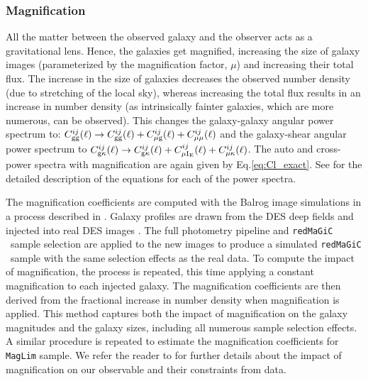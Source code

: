\documentclass[aps, prd,twocolumn,superscriptaddress,nofootinbib,preprintnumbers]{revtex4-1}
\newcommand{\redmagic}{\texttt{redMaGiC} }
\newcommand{\maglim}{\texttt{MagLim} }
\begin{document}
\subsubsection{Magnification}
All the matter between the observed galaxy and the observer acts as a gravitational lens. Hence, the galaxies get magnified, increasing the size of galaxy images (parameterized by the magnification factor, $\mu$) and increasing their total flux. The increase in the size of galaxies decreases the observed number density (due to stretching of the local sky), whereas increasing the total flux results in an increase in number density (as intrinsically fainter galaxies, which are more numerous, can be observed). This changes the galaxy-galaxy angular power spectrum to: $C^{ij}_{\rm gg}(\ell) \to C^{ij}_{\rm gg}(\ell) + C^{ij}_{\rm \mu g}(\ell) + C^{ij}_{\rm \mu \mu}(\ell) $ and the galaxy-shear angular power spectrum to $C^{ij}_{\rm g\kappa}(\ell) \to C^{ij}_{\rm g\kappa}(\ell) + C^{ij}_{\rm \mu I_{\rm E}}(\ell) + C^{ij}_{\rm \mu \kappa}(\ell)$. The auto and cross-power spectra with magnification are again given by Eq.\ref{eq:Cl_exact}. See \cite{y3-generalmethods} for the detailed description of the equations for each of the power spectra. 

The magnification coefficients are computed with the Balrog image simulations \citep{Suchyta_2016,y3-balrog} in a process described in \cite{y3-2x2ptmagnification}. Galaxy profiles are drawn from the DES deep fields \citep{y3-deepfields} and injected into real DES images \citep{Morganson_2018}. The full photometry pipeline \citep{y3-gold} and \redmagic\ sample selection are applied to the new images to produce a simulated \redmagic\ sample with the same selection effects as the real data. To compute the impact of magnification, the process is repeated, this time applying a constant magnification to each injected galaxy. The magnification coefficients are then derived from the fractional increase in number density when magnification is applied. This method captures both the impact of magnification on the galaxy magnitudes and the galaxy sizes, including all numerous sample selection effects. A similar procedure is repeated to estimate the magnification coefficients for \maglim sample. We refer the reader to \citet*{y3-2x2ptmagnification} for further details about the impact of magnification on our observable and their constraints from data. 
\end{document}
